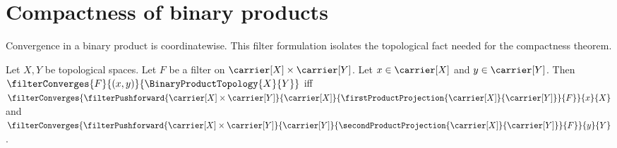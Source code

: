 \section{Compactness of binary products}




Convergence in a binary product is coordinatewise.  This filter formulation
isolates the topological fact needed for the compactness theorem.

\begin{theorem}\label{filter_converges_in_binary_product_iff_coordinates}
    Let $X,Y$ be topological spaces.
    Let $F$ be a filter on $\carrier[X]\times\carrier[Y]$.
    Let $x\in\carrier[X]$ and $y\in\carrier[Y]$.
    Then
        $\filterConverges{F}{(x,y)}{\BinaryProductTopology{X}{Y}}$ iff
        $\filterConverges{
            \filterPushforward{
                \carrier[X]\times\carrier[Y]}{\carrier[X]}{
                \firstProductProjection{\carrier[X]}{\carrier[Y]}}{F}
        }{x}{X}$ and
        $\filterConverges{
            \filterPushforward{
                \carrier[X]\times\carrier[Y]}{\carrier[Y]}{
                \secondProductProjection{\carrier[X]}{\carrier[Y]}}{F}
        }{y}{Y}$.
\end{theorem}
